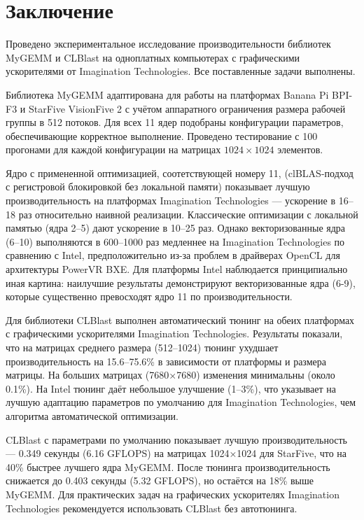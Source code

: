 
\section*{Заключение}

Проведено экспериментальное исследование производительности библиотек MyGEMM и CLBlast на одноплатных компьютерах с графическими ускорителями от Imagination Technologies. Все поставленные задачи выполнены.

Библиотека MyGEMM адаптирована для работы на платформах Banana Pi BPI-F3 и StarFive VisionFive 2 с учётом аппаратного ограничения размера рабочей группы в 512 потоков. Для всех 11 ядер подобраны конфигурации параметров, обеспечивающие корректное выполнение. Проведено тестирование с 100 прогонами для каждой конфигурации на матрицах $1024 \times 1024$ элементов.

Ядро с примененной оптимизацией, соотетствующей номеру 11, (clBLAS-подход с регистровой блокировкой без локальной памяти) показывает лучшую производительность на платформах Imagination Technologies --- ускорение в 16--18 раз относительно наивной реализации. Классические оптимизации с локальной памятью (ядра 2--5) дают ускорение в 10--25 раз. Однако векторизованные ядра (6--10) выполняются в 600--1000 раз медленнее на Imagination Technologies по сравнению с Intel, предположительно из-за проблем в драйверах OpenCL для архитектуры PowerVR BXE. Для платформы Intel наблюдается принципиально иная картина: наилучшие результаты демонстрируют векторизованные ядра (6-9), которые существенно превосходят ядро 11 по производительности.

Для библиотеки CLBlast выполнен автоматический тюнинг на обеих платформах с графическими ускорителями Imagination Technologies. Результаты показали, что на матрицах среднего размера (512--1024) тюнинг ухудшает производительность на 15.6--75.6\% в зависимости от платформы и размера матрицы. На больших матрицах (7680×7680) изменения минимальны (около 0.1\%). На Intel тюнинг даёт небольшое улучшение (1--3\%), что указывает на лучшую адаптацию параметров по умолчанию для Imagination Technologies, чем алгоритма автоматической оптимизации.

CLBlast с параметрами по умолчанию показывает лучшую производительность --- 0.349 секунды (6.16 GFLOPS) на матрицах 1024×1024 для StarFive, что на 40\% быстрее лучшего ядра MyGEMM. После тюнинга производительность снижается до 0.403 секунды (5.32 GFLOPS), но остаётся на 18\% выше MyGEMM. Для практических задач на графических ускорителях Imagination Technologies рекомендуется использовать CLBlast без автотюнинга.

